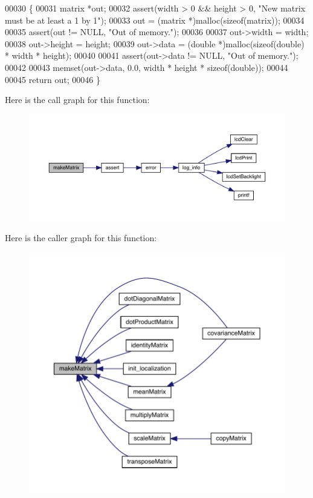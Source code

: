 \begin{DoxyCode}
00030                                           \{
00031   matrix *out;
00032   assert(width > 0 && height > 0, \textcolor{stringliteral}{"New matrix must be at least a 1 by 1"});
00033   out = (matrix *)malloc(\textcolor{keyword}{sizeof}(matrix));
00034 
00035   assert(out != NULL, \textcolor{stringliteral}{"Out of memory."});
00036 
00037   out->width = width;
00038   out->height = height;
00039   out->data = (\textcolor{keywordtype}{double} *)malloc(\textcolor{keyword}{sizeof}(\textcolor{keywordtype}{double}) * width * height);
00040 
00041   assert(out->data != NULL, \textcolor{stringliteral}{"Out of memory."});
00042 
00043   memset(out->data, 0.0, width * height * \textcolor{keyword}{sizeof}(\textcolor{keywordtype}{double}));
00044 
00045   \textcolor{keywordflow}{return} out;
00046 \}
\end{DoxyCode}
Here is the call graph for this function\+:
\nopagebreak
\begin{figure}[H]
\begin{center}
\leavevmode
\includegraphics[width=350pt]{matrix_8c_aae8b56c6fb44d9147b835f4006ca872c_cgraph}
\end{center}
\end{figure}
Here is the caller graph for this function\+:
\nopagebreak
\begin{figure}[H]
\begin{center}
\leavevmode
\includegraphics[width=350pt]{matrix_8c_aae8b56c6fb44d9147b835f4006ca872c_icgraph}
\end{center}
\end{figure}
